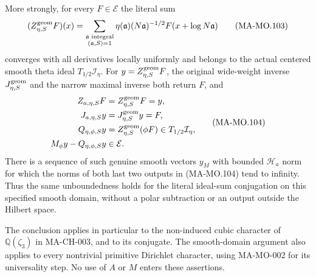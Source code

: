 More strongly, for every \(F\in\mathcal E\) the literal sum
\[
 (Z_{\eta,S}^{\rm geom}F)(x)
   =\sum_{\substack{\mathfrak a\text{ integral}\\
                         (\mathfrak a,S)=1}}
       \eta(\mathfrak a)(N\mathfrak a)^{-1/2}
                              F(x+\log N\mathfrak a)
 \tag{MA-MO.103}
\]
converges with all derivatives locally uniformly and belongs to
the actual centered smooth theta ideal \(T_{1/2}\mathcal I_\eta\).
For \(y=Z_{\eta,S}^{\rm geom}F\), the original wide-weight
inverse \(J_{\eta,S}^{\rm geom}\) and the narrow maximal inverse
both return \(F\), and
\[
 \begin{aligned}
 Z_{a,\eta,S}F&=Z_{\eta,S}^{\rm geom}F=y,\\
 J_{a,\eta,S}y&=J_{\eta,S}^{\rm geom}y=F,\\
 Q_{\eta,\phi,S}y
   &=Z_{\eta,S}^{\rm geom}(\phi F)
                    \in T_{1/2}\mathcal I_\eta,\\
 M_\phi y-Q_{\eta,\phi,S}y&\in\mathcal E.
 \end{aligned}
 \tag{MA-MO.104}
\]
There is a sequence of such genuine smooth vectors \(y_M\)
with bounded \(\mathcal H_a\) norm for which the norms of
both last two outputs in (MA-MO.104) tend to infinity.
Thus the same unboundedness holds for the literal ideal-sum
conjugation on this specified smooth domain, without a polar
subtraction or an output outside the Hilbert space.

The conclusion applies in particular to the non-induced cubic
character of \(\mathbb Q(\zeta_3)\) in MA-CH-003, and to its
conjugate. The smooth-domain argument also applies to every
nontrivial primitive Dirichlet character, using MA-MO-002 for
its universality step. No use of \(A\) or \(M\) enters these
assertions.

